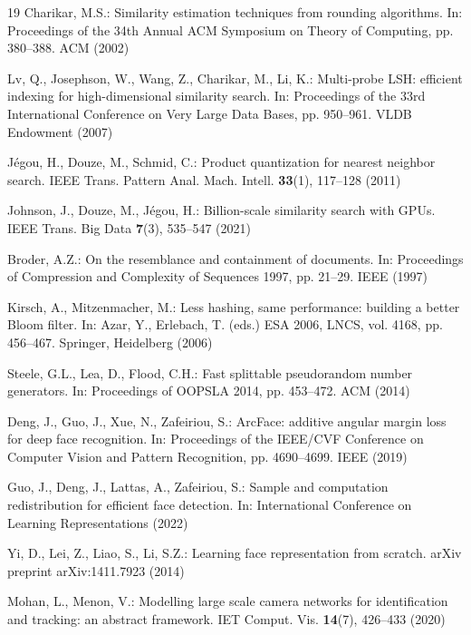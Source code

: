 \documentclass[runningheads]{llncs}
\begin{document}
\begin{thebibliography}{19}
 Charikar, M.S.: Similarity estimation techniques from rounding algorithms.
In: Proceedings of the 34th Annual ACM Symposium on Theory of Computing, pp. 380--388. ACM (2002)

 Lv, Q., Josephson, W., Wang, Z., Charikar, M., Li, K.: Multi-probe LSH: efficient
indexing for high-dimensional similarity search. In: Proceedings of the 33rd International Conference on
Very Large Data Bases, pp. 950--961. VLDB Endowment (2007)

 J\'egou, H., Douze, M., Schmid, C.: Product quantization for nearest neighbor search.
IEEE Trans. Pattern Anal. Mach. Intell. \textbf{33}(1), 117--128 (2011)

 Johnson, J., Douze, M., J\'egou, H.: Billion-scale similarity search with GPUs.
IEEE Trans. Big Data \textbf{7}(3), 535--547 (2021)

 Broder, A.Z.: On the resemblance and containment of documents. In: Proceedings of
Compression and Complexity of Sequences 1997, pp. 21--29. IEEE (1997)

 Kirsch, A., Mitzenmacher, M.: Less hashing, same performance: building a
better Bloom filter. In: Azar, Y., Erlebach, T. (eds.) ESA 2006, LNCS, vol. 4168, pp. 456--467.
Springer, Heidelberg (2006)

 Steele, G.L., Lea, D., Flood, C.H.: Fast splittable pseudorandom number
generators. In: Proceedings of OOPSLA 2014, pp. 453--472. ACM (2014)

 Deng, J., Guo, J., Xue, N., Zafeiriou, S.: ArcFace: additive angular margin loss
for deep face recognition. In: Proceedings of the IEEE/CVF Conference on Computer Vision and Pattern
Recognition, pp. 4690--4699. IEEE (2019)

 Guo, J., Deng, J., Lattas, A., Zafeiriou, S.: Sample and computation redistribution for
efficient face detection. In: International Conference on Learning Representations (2022)

 Yi, D., Lei, Z., Liao, S., Li, S.Z.: Learning face representation from scratch.
arXiv preprint arXiv:1411.7923 (2014)

 Mohan, L., Menon, V.: Modelling large scale camera networks for identification and
tracking: an abstract framework. IET Comput. Vis. \textbf{14}(7), 426--433 (2020)

\end{thebibliography}
\end{document}
